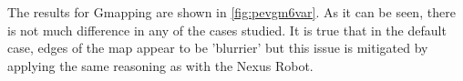 The results for Gmapping are shown in \autoref{fig:pevgm6var}. As it can be seen, there is not much difference in any of the cases studied.
It is true that in the default case, edges of the map appear to be 'blurrier' but this issue is mitigated by applying the same reasoning as with the Nexus Robot. 
\begin{figure}[htb]
  \centering
   \quad
   \\
   \quad 
   \\  

\end{figure}
